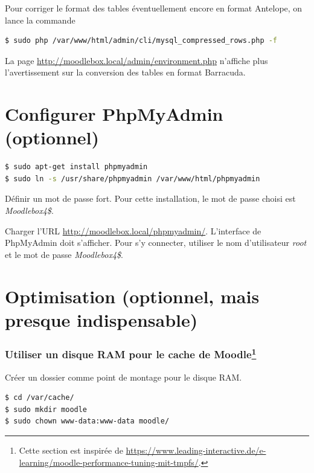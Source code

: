 \documentclass[11pt]{article}
\begin{document}
Pour corriger le format des tables éventuellement encore en format Antelope, on lance la commande

\begin{lstlisting}[language=bash]
$ sudo php /var/www/html/admin/cli/mysql_compressed_rows.php -f
\end{lstlisting}

\begin{verification}
La page \url{http://moodlebox.local/admin/environment.php} n'affiche plus l'avertissement sur la conversion des tables en format Barracuda.
\end{verification}

\section{Configurer PhpMyAdmin (optionnel)}

\begin{lstlisting}[language=bash]
$ sudo apt-get install phpmyadmin
$ sudo ln -s /usr/share/phpmyadmin /var/www/html/phpmyadmin
\end{lstlisting}
Définir un mot de passe fort. Pour cette installation, le mot de passe choisi est \emph{Moodlebox4\$}.

\begin{verification}
Charger l'URL \url{http://moodlebox.local/phpmyadmin/}. L'interface de PhpMyAdmin doit s'afficher. Pour s'y connecter, utiliser le nom d'utilisateur \emph{root} et le mot de passe \emph{Moodlebox4\$}.
\end{verification}

\section{Optimisation (optionnel, mais presque indispensable)}

\subsubsection[Utiliser un disque RAM pour le cache de Moodle]{Utiliser un disque RAM pour le cache de Moodle\footnote{Cette section est inspirée de \url{https://www.leading-interactive.de/e-learning/moodle-performance-tuning-mit-tmpfs/}.}}

Créer un dossier comme point de montage pour le disque RAM.
\begin{lstlisting}[language=bash]
$ cd /var/cache/
$ sudo mkdir moodle
$ sudo chown www-data:www-data moodle/
\end{lstlisting}
\end{document}
